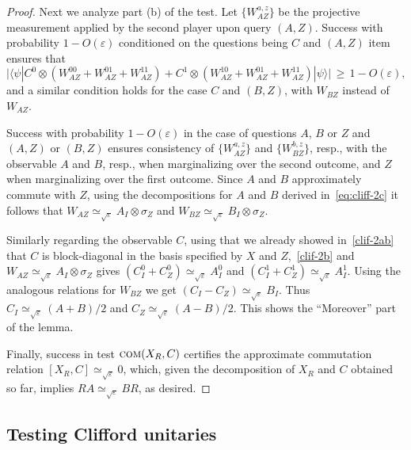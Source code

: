 \documentclass{toc}
\newcommand{\ket}[1]{|#1\rangle}
\newcommand{\bra}[1]{\langle#1|}
\newcommand{\eps}{\varepsilon}
\newcommand{\comt}{\textsc{com}}
\begin{document}
\begin{proof}
Next we analyze part (b) of the test. Let $\{W_{AZ}^{a,z}\}$ be the projective measurement applied by the second player upon query $(A,Z)$. Success with probability $1-O(\eps)$ conditioned on the questions being $C$ and $(A,Z)$ item ensures that 
\begin{equation}\label{clif-2b}
\big| \bra{\psi} C^0 \otimes (W_{AZ}^{00} + W_{AZ}^{01} + W_{AZ}^{11}) + C^1\otimes (W_{AZ}^{10} + W_{AZ}^{01} + W_{AZ}^{11}) \ket{\psi} \big| \,\geq\,1-O(\eps),
\end{equation}
and a similar condition holds for the case $C$ and $(B,Z)$, with $W_{BZ}$ instead of $W_{AZ}$. 

Success with probability $1-O(\eps)$ in the case of questions $A$, $B$ or $Z$ and $(A,Z)$ or $(B,Z)$ %
ensures consistency of $\{W_{AZ}^{a,z}\}$
and $\{W_{BZ}^{b,z}\}$, resp., %
with the observable $A$ %
and $B$, resp., 
when marginalizing over the second outcome, 
and $Z$ when marginalizing over the first outcome.  Since
$A$ and $B$   %
approximately commute
with $Z$,  %
using the decompositions for $A$ and $B$ derived in~\eqref{eq:cliff-2c} it follows that $W_{AZ} \simeq_{\sqrt{\eps}} A_I \otimes \sigma_Z$ and $W_{BZ} \simeq_{\sqrt{\eps}} B_I \otimes \sigma_Z$. 

Similarly regarding the observable $C$, using that we already showed in~\eqref{clif-2ab} that $C$ is block-diagonal in the basis specified by $X$ and $Z$,~\eqref{clif-2b} and $W_{AZ} \simeq_{\sqrt{\eps}} A_I \otimes \sigma_Z$ gives $(C_I^0 + C_Z^0) \simeq_{\sqrt{\eps}} A_I^0$ and $(C_I^1 + C_Z^1) \simeq_{\sqrt{\eps}} A_I^1$. Using the analogous relations for $W_{BZ}$ we get $(C_I - C_Z) \simeq_{\sqrt{\eps}} B_I$. Thus $C_I \simeq_{\sqrt{\eps}} (A+B)/2$ and $C_Z \simeq_{\sqrt{\eps}} (A-B)/2$. This shows the ``Moreover'' part of the lemma. 

Finally, success in test $\comt(X_R,C)$ certifies the approximate commutation relation $[X_R,C]\simeq_{\sqrt{\eps}} 0$, which, given the decomposition of $X_R$ and $C$ obtained so far, implies $RA \simeq_{\sqrt{\eps}} B R$, as desired. 
\end{proof}



\subsection{Testing Clifford unitaries}
\label{sec:n-clifford}
\end{document}
